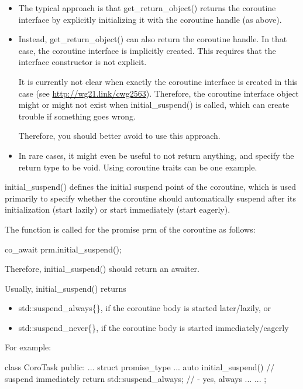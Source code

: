 \begin{itemize}
\item 
The typical approach is that get\_return\_object() returns the coroutine interface by explicitly initializing it with the coroutine handle (as above).

\item
Instead, get\_return\_object() can also return the coroutine handle. In that case, the coroutine interface is implicitly created. This requires that the interface constructor is not explicit.

It is currently not clear when exactly the coroutine interface is created in this case (see \url{http://wg21.link/cwg2563}). Therefore, the coroutine interface object might or might not exist when initial\_suspend() is called, which can create trouble if something goes wrong.

Therefore, you should better avoid to use this approach.

\item
In rare cases, it might even be useful to not return anything, and specify the return type to be void. Using coroutine traits can be one example.
\end{itemize}


initial\_suspend() defines the initial suspend point of the coroutine, which is used primarily to specify whether the coroutine should automatically suspend after its initialization (start lazily) or start immediately (start eagerly).

The function is called for the promise prm of the coroutine as follows:

\begin{cpp}
co_await prm.initial_suspend();
\end{cpp}

Therefore, initial\_suspend() should return an awaiter.

Usually, initial\_suspend() returns

\begin{itemize}
\item 
std::suspend\_always\{\}, if the coroutine body is started later/lazily, or

\item
std::suspend\_never\{\}, if the coroutine body is started immediately/eagerly
\end{itemize}

For example:

\begin{cpp}
class CoroTask {
	public:
	...
	struct promise_type {
		...
		auto initial_suspend() { // suspend immediately
			return std::suspend_always{}; // - yes, always
		}
		...
	}
	...
};
\end{cpp}


